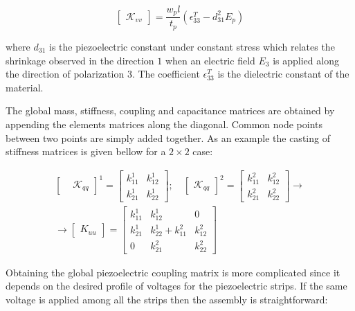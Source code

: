 \documentclass{ifacconf}
\begin{document}
\begin{equation}
\begin{bmatrix}
\mathcal{K}_{vv}
\end{bmatrix} = \frac{w_pl}{t_p}(\epsilon^T_{33} - d_{31}^2E_p)
\end{equation}

where $d_{31}$ is the piezoelectric constant under constant stress which relates the shrinkage observed in the direction $1$ when an electric field $E_3$ is applied along the direction of polarization $3$. The coefficient $\epsilon^T_{33}$ is the dielectric constant of the material. 

The global mass, stiffness, coupling and capacitance matrices are obtained by appending the elements matrices along the diagonal. Common node points between two points are simply added together. As an example the casting of stiffness matrices is given bellow for a $2\times2$ case:

\begin{equation}
\begin{split}
\begin{bmatrix}
& \mathcal{K}_{qq}
\end{bmatrix}^1 = \begin{bmatrix}
k^1_{11} & k^1_{12} \\ k^1_{21} & k^1_{22}
\end{bmatrix}; \quad \begin{bmatrix}
\mathcal{K}_{qq}
\end{bmatrix}^2 = \begin{bmatrix}
k^2_{11} & k^2_{12} \\ k^2_{21} & k^2_{22}
\end{bmatrix} \rightarrow  \\ \rightarrow \begin{bmatrix}
K_{uu}
\end{bmatrix} = \begin{bmatrix}
k^1_{11} & k^1_{12} & 0\\ k^1_{21} & k^1_{22}+ k^2_{11} & k^2_{12}  \\ 0 & k^2_{21} & k^2_{22} 
\end{bmatrix}
\end{split}
\end{equation}

Obtaining the global piezoelectric coupling matrix is more complicated since it depends on the desired profile of voltages for the piezoelectric strips. If the same voltage is applied among all the strips then the assembly is straightforward:
\end{document}
